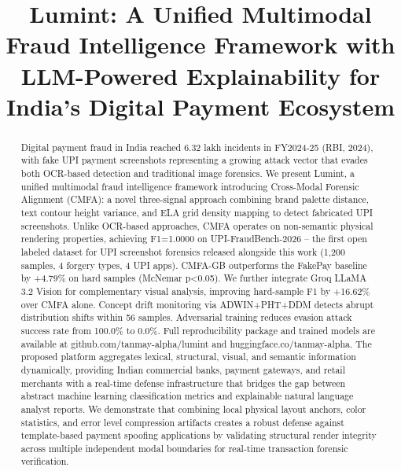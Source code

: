 \documentclass[journal]{IEEEtran}
\begin{document}
\title{Lumint: A Unified Multimodal Fraud Intelligence Framework with LLM-Powered Explainability for India's Digital Payment Ecosystem}

\author{
}

\maketitle

\begin{abstract}
Digital payment fraud in India reached 6.32 lakh incidents in FY2024-25 (RBI, 2024), with fake UPI payment screenshots representing a growing attack vector that evades both OCR-based detection and traditional image forensics. We present Lumint, a unified multimodal fraud intelligence framework introducing Cross-Modal Forensic Alignment (CMFA): a novel three-signal approach combining brand palette distance, text contour height variance, and ELA grid density mapping to detect fabricated UPI screenshots. Unlike OCR-based approaches, CMFA operates on non-semantic physical rendering properties, achieving F1=1.0000 on UPI-FraudBench-2026 -- the first open labeled dataset for UPI screenshot forensics released alongside this work (1,200 samples, 4 forgery types, 4 UPI apps). CMFA-GB outperforms the FakePay baseline by +4.79\% on hard samples (McNemar p<0.05). We further integrate Groq LLaMA 3.2 Vision for complementary visual analysis, improving hard-sample F1 by +16.62\% over CMFA alone. Concept drift monitoring via ADWIN+PHT+DDM detects abrupt distribution shifts within 56 samples. Adversarial training reduces evasion attack success rate from 100.0\% to 0.0\%. Full reproducibility package and trained models are available at github.com/tanmay-alpha/lumint and huggingface.co/tanmay-alpha. The proposed platform aggregates lexical, structural, visual, and semantic information dynamically, providing Indian commercial banks, payment gateways, and retail merchants with a real-time defense infrastructure that bridges the gap between abstract machine learning classification metrics and explainable natural language analyst reports. We demonstrate that combining local physical layout anchors, color statistics, and error level compression artifacts creates a robust defense against template-based payment spoofing applications by validating structural render integrity across multiple independent modal boundaries for real-time transaction forensic verification.
\end{abstract}
\end{document}
